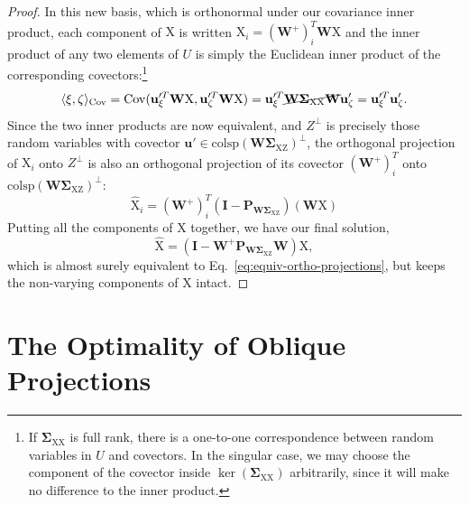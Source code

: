 \documentclass{article}
\theoremstyle{plain}
\theoremstyle{remark}
\newcommand{\sxx}{\mathbf \Sigma_{\rv X \rv X}}
\newcommand{\sxz}{\mathbf \Sigma_{\rv X \rv Z}}
\newcommand{\pwxz}{\mathbf P_{\mathbf{W}\sxz}}
\theoremstyle{plain}
\theoremstyle{TheoremNum}
\newcommand{\rv}[1]{{\mathrm{#1}}}
\begin{document}
\begin{proof}
    In this new basis, which is orthonormal under our covariance inner product, each component of $\rv X$ is written $\rv X_i = (\mathbf{W}^+)_i^T \mathbf{W}\rv X$ and the inner product of any two elements of $U$ is simply the Euclidean inner product of the corresponding covectors:\footnote{If $\sxx$ is full rank, there is a one-to-one correspondence between random variables in $U$ and covectors. In the singular case, we may choose the component of the covector inside $\ker(\sxx)$ arbitrarily, since it will make no difference to the inner product.}
    \begin{equation*}\label{inner-prod-equiv}
        \langle \xi, \zeta\rangle_\mathrm{Cov} = \mathrm{Cov}(\mathbf{u}_{\xi}'^T \mathbf{W} \rv X, \mathbf{u}_{\zeta}'^T \mathbf{W} \rv X) = \mathbf{u}_{\xi}'^T \cancel{\mathbf{W} \sxx \mathbf{W}} \mathbf{u}_{\zeta}' = \mathbf{u}_{\xi}'^T \mathbf{u}_{\zeta}'.
    \end{equation*}
    Since the two inner products are now equivalent, and $Z^\perp$ is precisely those random variables with covector $\mathbf{u}' \in \mathrm{colsp}(\mathbf{W}\sxz)^\perp$, the orthogonal projection of $\rv X_i$ onto $Z^\perp$ is also an orthogonal projection of its covector $(\mathbf{W}^+)_i^T$ onto $\mathrm{colsp}(\mathbf{W}\sxz)^\perp$:
    \begin{equation}\label{eq:equiv-ortho-projections}
        \hat{\rv X}_i = (\mathbf{W}^+)_i^T (\mathbf{I} - \pwxz) (\mathbf{W}\rv X)
    \end{equation}
    Putting all the components of $\rv X$ together, we have our final solution,
    \begin{equation*}
        \hat{\rv X} = (\mathbf{I} - \mathbf{W}^+ \pwxz \mathbf{W})\rv X,
    \end{equation*}
    which is almost surely equivalent to Eq.~\ref{eq:equiv-ortho-projections}, but keeps the non-varying components of $\rv X$ intact.
\end{proof}

\section{The Optimality of Oblique Projections}\label{app:oblique-optimality}
\end{document}
